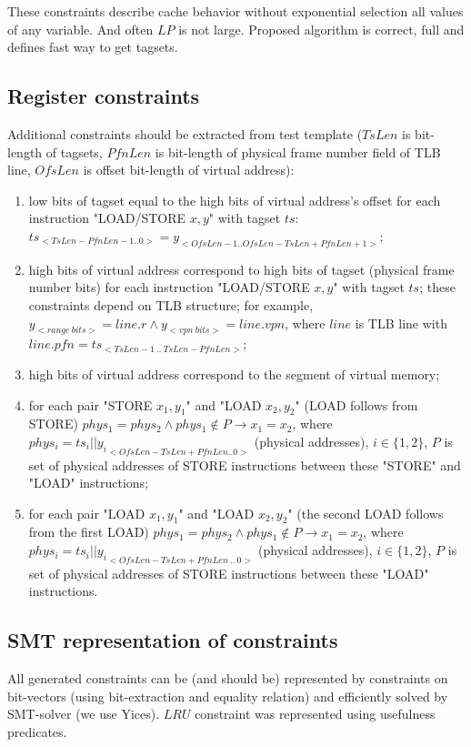 \documentclass[times, 10pt,twocolumn]{article}
\begin{document}
These constraints describe cache behavior without exponential selection all values of any variable. And often $LP$ is not large. Proposed algorithm is correct, full and defines fast way to get tagsets.

\subsection{Register constraints}
Additional constraints should be extracted from test template
($TsLen$ is bit-length of tagsets, $PfnLen$ is bit-length of
physical frame number field of TLB line, $OfsLen$ is offset
bit-length of virtual address):

\begin{enumerate}

\item low bits of tagset equal to the high bits of virtual address's offset for each
instruction "LOAD/STORE $x, y$" with tagset $ts$:
$ts_{<TsLen-PfnLen-1..0>} = y_{<OfsLen-1..OfsLen-TsLen+PfnLen+1>}$;

\item high bits of virtual address correspond to high bits of tagset
(physical frame number bits) for each instruction "LOAD/STORE $x,
y$" with tagset $ts$; these constraints depend on TLB structure; for
example, $y_{<range~bits>} = line.r \wedge y_{<vpn~bits>} =
line.vpn$, where $line$ is TLB line with $line.pfn =
ts_{<TsLen-1~..~TsLen-PfnLen>}$;

\item high bits of virtual address correspond to the segment of virtual memory;

\item for each pair "STORE $x_1, y_1$"
and "LOAD $x_2, y_2$" (LOAD follows from STORE) $phys_1 = phys_2
\wedge phys_1 \notin P \rightarrow x_1 = x_2$, where $phys_i = ts_i
|| {y_i}_{<OfsLen-TsLen+PfnLen..0>}$ (physical addresses), $i \in
\{1, 2\}$, $P$ is set of physical addresses of STORE instructions
between these "STORE" and "LOAD" instructions;

\item for each pair "LOAD
$x_1, y_1$" and "LOAD $x_2, y_2$" (the second LOAD follows from the
first LOAD) $phys_1 = phys_2 \wedge phys_1 \notin P \rightarrow x_1
= x_2$, where $phys_i = ts_i || {y_i}_{<OfsLen-TsLen+PfnLen~..~0>}$
(physical addresses), $i \in \{1, 2\}$, $P$ is set of physical
addresses of STORE instructions between these "LOAD" instructions.
\end{enumerate}

\subsection{SMT representation of constraints}
All generated constraints can be (and should be) represented by constraints on bit-vectors (using bit-extraction and equality relation) and efficiently solved by SMT-solver (we use Yices). $LRU$ constraint was represented using usefulness predicates.
\end{document}

